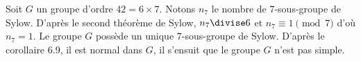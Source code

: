 Soit $G$ un groupe d'ordre $42 = 6\times 7$. Notons $n_7$ le nombre de
7-sous-groupe de Sylow. D'après le second théorème de Sylow, $n_7\divise 6$ et
$n_7\equiv 1\pmod{7}$ d'où $n_7 = 1$. Le groupe $G$ possède un unique
$7$-sous-groupe de Sylow. D'après le corollaire 6.9, il est normal dans $G$, il
s'ensuit que le groupe $G$ n'est pas simple.

